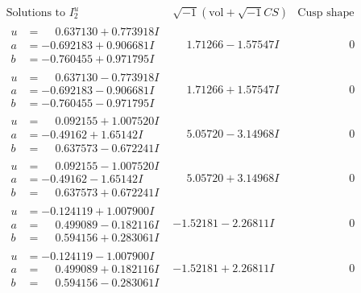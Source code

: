 \documentclass[1p]{elsarticle_modified}
\theoremstyle{definition}
\newcommand{\I}{\sqrt{-1}}
\begin{document}
$$\begin{array}{c|c|c}  
\text{Solutions to }I^u_{2}& \I (\text{vol} + \sqrt{-1}CS) & \text{Cusp shape}\\
 \hline 
\begin{aligned}
u &= \phantom{-}0.637130 + 0.773918 I \\
a &= -0.692183 + 0.906681 I \\
b &= -0.760455 + 0.971795 I\end{aligned}
 & \phantom{-}1.71266 - 1.57547 I & \phantom{-0.000000 } 0 \\ \hline\begin{aligned}
u &= \phantom{-}0.637130 - 0.773918 I \\
a &= -0.692183 - 0.906681 I \\
b &= -0.760455 - 0.971795 I\end{aligned}
 & \phantom{-}1.71266 + 1.57547 I & \phantom{-0.000000 } 0 \\ \hline\begin{aligned}
u &= \phantom{-}0.092155 + 1.007520 I \\
a &= -0.49162 + 1.65142 I \\
b &= \phantom{-}0.637573 - 0.672241 I\end{aligned}
 & \phantom{-}5.05720 - 3.14968 I & \phantom{-0.000000 } 0 \\ \hline\begin{aligned}
u &= \phantom{-}0.092155 - 1.007520 I \\
a &= -0.49162 - 1.65142 I \\
b &= \phantom{-}0.637573 + 0.672241 I\end{aligned}
 & \phantom{-}5.05720 + 3.14968 I & \phantom{-0.000000 } 0 \\ \hline\begin{aligned}
u &= -0.124119 + 1.007900 I \\
a &= \phantom{-}0.499089 - 0.182116 I \\
b &= \phantom{-}0.594156 + 0.283061 I\end{aligned}
 & -1.52181 - 2.26811 I & \phantom{-0.000000 } 0 \\ \hline\begin{aligned}
u &= -0.124119 - 1.007900 I \\
a &= \phantom{-}0.499089 + 0.182116 I \\
b &= \phantom{-}0.594156 - 0.283061 I\end{aligned}
 & -1.52181 + 2.26811 I & \phantom{-0.000000 } 0 \\ \hline\begin{aligned}

\end{aligned}
\end{array}$$
\end{document}
